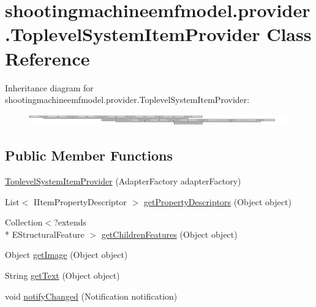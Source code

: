 \hypertarget{classshootingmachineemfmodel_1_1provider_1_1_toplevel_system_item_provider}{\section{shootingmachineemfmodel.\-provider.\-Toplevel\-System\-Item\-Provider Class Reference}
\label{classshootingmachineemfmodel_1_1provider_1_1_toplevel_system_item_provider}
}
Inheritance diagram for shootingmachineemfmodel.\-provider.\-Toplevel\-System\-Item\-Provider\-:\begin{figure}[H]
\begin{center}
\leavevmode
\includegraphics[height=0.488656cm]{classshootingmachineemfmodel_1_1provider_1_1_toplevel_system_item_provider}
\end{center}
\end{figure}
\subsection*{Public Member Functions}
\begin{DoxyCompactItemize}
\item 
\hyperlink{classshootingmachineemfmodel_1_1provider_1_1_toplevel_system_item_provider_ac3382798c2b1db926d97ed997b409456}{Toplevel\-System\-Item\-Provider} (Adapter\-Factory adapter\-Factory)
\item 
List$<$ I\-Item\-Property\-Descriptor $>$ \hyperlink{classshootingmachineemfmodel_1_1provider_1_1_toplevel_system_item_provider_afadb47f8265682dbffeaefdfd3a35310}{get\-Property\-Descriptors} (Object object)
\item 
Collection$<$?extends \\*
E\-Structural\-Feature $>$ \hyperlink{classshootingmachineemfmodel_1_1provider_1_1_toplevel_system_item_provider_a4af442c61511e5d87c12432334f6b231}{get\-Children\-Features} (Object object)
\item 
Object \hyperlink{classshootingmachineemfmodel_1_1provider_1_1_toplevel_system_item_provider_a7915a80337ba2f09ec856e28a954cbed}{get\-Image} (Object object)
\item 
String \hyperlink{classshootingmachineemfmodel_1_1provider_1_1_toplevel_system_item_provider_a9439117dac9403ab612d3a61baf864c8}{get\-Text} (Object object)
\item 
void \hyperlink{classshootingmachineemfmodel_1_1provider_1_1_toplevel_system_item_provider_a6aec376e525c06646b0341f166d0cdd9}{notify\-Changed} (Notification notification)
\end{DoxyCompactItemize}
